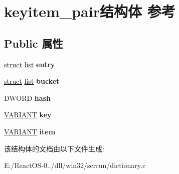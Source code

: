 \hypertarget{structkeyitem__pair}{}\section{keyitem\+\_\+pair结构体 参考}
\label{structkeyitem__pair}
\subsection*{Public 属性}
\begin{DoxyCompactItemize}
\item 
\mbox{\label{structkeyitem__pair_a54c12bdc52d83b820414b7cd2c160c33}} 
\hyperlink{interfacestruct}{struct} \hyperlink{classlist}{list} {\bfseries entry}
\item 
\mbox{\label{structkeyitem__pair_afc95522097be9af8791f8d5129f79d8a}} 
\hyperlink{interfacestruct}{struct} \hyperlink{classlist}{list} {\bfseries bucket}
\item 
\mbox{\label{structkeyitem__pair_a673f81882e01a92f8b4e163f67537d06}} 
D\+W\+O\+RD {\bfseries hash}
\item 
\mbox{\label{structkeyitem__pair_ad86cfa67f298f4ba3dd7b252e6bb8e4a}} 
\hyperlink{structtag_v_a_r_i_a_n_t}{V\+A\+R\+I\+A\+NT} {\bfseries key}
\item 
\mbox{\label{structkeyitem__pair_a456aac48dedc5d5b7fdc165c05ff0767}} 
\hyperlink{structtag_v_a_r_i_a_n_t}{V\+A\+R\+I\+A\+NT} {\bfseries item}
\end{DoxyCompactItemize}


该结构体的文档由以下文件生成\+:\begin{DoxyCompactItemize}
\item 
E\+:/\+React\+O\+S-\/0../dll/win32/scrrun/dictionary.\+c\end{DoxyCompactItemize}
